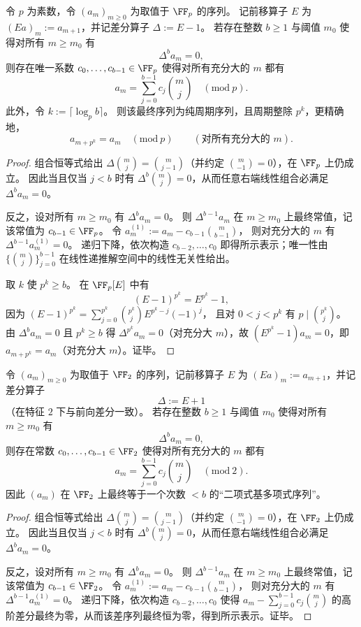 \begin{theorem}[模 \(p\) 的幂零差分与二项式基规范形]\label{thm:pom-modp-difference-binomial-basis}
令 \(p\) 为素数，令 \((a_m)_{m\ge 0}\) 为取值于 \(\FF_p\) 的序列。
记前移算子 \(E\) 为 \((Ea)_m:=a_{m+1}\)，并记差分算子 \(\Delta:=E-1\)。
若存在整数 \(b\ge 1\) 与阈值 \(m_0\) 使得对所有 \(m\ge m_0\) 有
\[
\Delta^b a_m=0,
\]
则存在唯一系数 \(c_0,\dots,c_{b-1}\in\FF_p\) 使得对所有充分大的 \(m\) 都有
\[
a_m=\sum_{j=0}^{b-1} c_j\binom{m}{j}\quad(\mathrm{mod}\ p).
\]
此外，令 \(k:=\lceil\log_p b\rceil\)。
则该最终序列为纯周期序列，且周期整除 \(p^k\)，更精确地，
\[
a_{m+p^k}=a_m\quad(\mathrm{mod}\ p)
\qquad
(\text{对所有充分大的 }m).
\]
\end{theorem}
\begin{proof}
组合恒等式给出 \(\Delta\binom{m}{j}=\binom{m}{j-1}\)（并约定 \(\binom{m}{-1}=0\)），在 \(\FF_p\) 上仍成立。
因此当且仅当 \(j<b\) 时有 \(\Delta^b\binom{m}{j}=0\)，从而任意右端线性组合必满足 \(\Delta^b a_m=0\)。
\par
反之，设对所有 \(m\ge m_0\) 有 \(\Delta^b a_m=0\)。
则 \(\Delta^{b-1}a_m\) 在 \(m\ge m_0\) 上最终常值，记该常值为 \(c_{b-1}\in\FF_p\)。
令
\(
a^{(1)}_m:=a_m-c_{b-1}\binom{m}{b-1}
\)，
则对充分大的 \(m\) 有 \(\Delta^{b-1}a^{(1)}_m=0\)。
递归下降，依次构造 \(c_{b-2},\dots,c_0\) 即得所示表示；唯一性由 \(\{\binom{m}{j}\}_{j=0}^{b-1}\) 在线性递推解空间中的线性无关性给出。
\par
取 \(k\) 使 \(p^k\ge b\)。
在 \(\FF_p[E]\) 中有
\[
(E-1)^{p^k}=E^{p^k}-1,
\]
因为
\((E-1)^{p^k}=\sum_{j=0}^{p^k}\binom{p^k}{j}E^{p^k-j}(-1)^j\)，
且对 \(0<j<p^k\) 有 \(p\mid \binom{p^k}{j}\)。
由 \(\Delta^b a_m=0\) 且 \(p^k\ge b\) 得 \(\Delta^{p^k}a_m=0\)（对充分大 \(m\)），故 \((E^{p^k}-1)a_m=0\)，即 \(a_{m+p^k}=a_m\)（对充分大 \(m\)）。证毕。
\end{proof}

\begin{theorem}[模 \(2\) 塌缩特征多项式强制的高阶差分多项式性]\label{thm:pom-mod2-difference-binomial-basis}
令 \((a_m)_{m\ge 0}\) 为取值于 \(\FF_2\) 的序列，记前移算子 \(E\) 为 \((Ea)_m:=a_{m+1}\)，并记差分算子
\[
\Delta:=E+1
\]
（在特征 \(2\) 下与前向差分一致）。
若存在整数 \(b\ge 1\) 与阈值 \(m_0\) 使得对所有 \(m\ge m_0\) 有
\[
\Delta^b a_m=0,
\]
则存在常数 \(c_0,\dots,c_{b-1}\in\FF_2\) 使得对所有充分大的 \(m\) 都有
\[
a_m=\sum_{j=0}^{b-1} c_j\binom{m}{j}\quad(\mathrm{mod}\ 2).
\]
因此 \((a_m)\) 在 \(\FF_2\) 上最终等于一个次数 \(<b\) 的“二项式基多项式序列”。
\end{theorem}

\begin{proof}
组合恒等式给出 \(\Delta\binom{m}{j}=\binom{m}{j-1}\)（并约定 \(\binom{m}{-1}=0\)），在 \(\FF_2\) 上仍成立。
因此当且仅当 \(j<b\) 时有 \(\Delta^b\binom{m}{j}=0\)，从而任意右端线性组合必满足 \(\Delta^b a_m=0\)。
\par
反之，设对所有 \(m\ge m_0\) 有 \(\Delta^b a_m=0\)。
则 \(\Delta^{b-1}a_m\) 在 \(m\ge m_0\) 上最终常值，记该常值为 \(c_{b-1}\in\FF_2\)。
令
\(
a^{(1)}_m:=a_m-c_{b-1}\binom{m}{b-1}
\)，
则对充分大的 \(m\) 有 \(\Delta^{b-1}a^{(1)}_m=0\)。
递归下降，依次构造 \(c_{b-2},\dots,c_0\) 使得
\(
a_m-\sum_{j=0}^{b-1}c_j\binom{m}{j}
\)
的高阶差分最终为零，从而该差序列最终恒为零，得到所示表示。证毕。
\end{proof}

